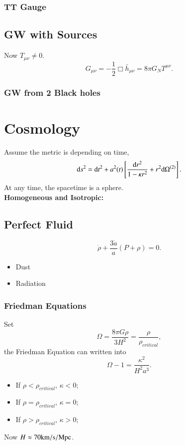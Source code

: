 \documentclass[openany,10pt]{book}
\theoremstyle{definition}
\theoremstyle{definition}
\theoremstyle{remark}
\begin{document}
\subsection{TT Gauge}
\section{GW with Sources}
Now $T_{\mu\nu}\neq0$.
\begin{equation}
    G_{\mu\nu}=-\frac12\Box \bar{h}_{\mu\nu}=8\pi G_N T^{\mu\nu}.
\end{equation}
\subsection{GW from 2 Black holes}




\chapter{Cosmology}
Assume the metric is depending on time,
\begin{equation}
    {\rm d}s^2={\rm d}t^2+a^2(t)\left[\frac{{\rm d}r^2}{1-\kappa r^2}+r^2{\rm d}\Omega^{(2)}\right].
\end{equation}
At any time, the spacetime is a sphere.\\


\bfseries{Homogeneous and Isotropic:}

\section{Perfect Fluid}
\begin{equation}
    \dot\rho+\frac{3\dot a}{a}\left(P+\rho\right)=0.
\end{equation}
\begin{itemize}
    \item Dust
    
    \item Radiation
\end{itemize}

\subsection{Friedman Equations}



Set 
\begin{equation}
    \Omega=\frac{8\pi G\rho}{3H^2}=\frac{\rho}{\rho_{critical}},
\end{equation}
the Friedman Equation can written into 
\begin{equation}
    \Omega-1=\frac{\kappa^2}{H^2a^3}.
\end{equation}
\begin{itemize}
    \item If $\rho<\rho_{critical}$, $\kappa<0$;
    \item If $\rho=\rho_{critical}$, $\kappa=0$;
    \item If $\rho>\rho_{critical}$, $\kappa>0$;
\end{itemize}
Now $H\approx70{\rm km/s}/{\rm Mpc}$.
\end{document}
